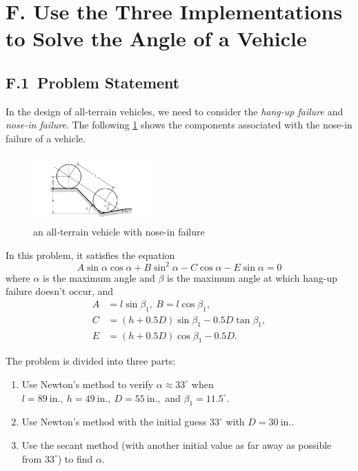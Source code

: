 \documentclass[a4paper]{article}
\begin{document}
\section*{F. Use the Three Implementations to Solve the Angle of a Vehicle}

\subsection*{F.1\ Problem Statement}

In the design of all-terrain vehicles, we need to consider the \textit{hang-up failure} and \textit{nose-in failure}. 
The following \cref{fig:F} shows the components associated with the nose-in failure of a vehicle. 

\begin{figure}[htbp]
  \centering
  \includegraphics[width = 0.4\textwidth]{../images/F.png}
  \caption{an all-terrain vehicle with nose-in failure}
  \label{fig:F}
\end{figure}

In this problem, it satisfies the equation
\begin{equation}
  A \sin \alpha \cos \alpha + B \sin^2 \alpha - C \cos \alpha - E \sin \alpha = 0
  \label{eq:F}
\end{equation}
where $\alpha$ is the maximum angle and $\beta$ is the maximum angle at which hang-up failure doesn't occur, and 
\begin{equation}
  \begin{aligned}
    A &= l \sin \beta_1,\ B = l \cos \beta_1, \\
    C &= (h + 0.5D)\sin \beta_1 - 0.5 D \tan \beta_1, \\
    E &= (h + 0.5D)\cos \beta_1 - 0.5D.
  \end{aligned}
  \label{eq:F.components}
\end{equation}

The problem is divided into three parts:
\begin{enumerate}
  \item Use Newton's method to verify $\alpha \approx 33^{\circ}$ when $l = 89\ \mathrm{in.},\ h = 49\ \mathrm{in.},\ D = 55\ \mathrm{in.},$ and $\beta_1 = 11.5^{\circ}$.
  \item Use Newton's method with the initial guess $33^{\circ}$ with $D = 30\ \mathrm{in.}$.
  \item Use the secant method (with another initial value as far away as possible from $33^{\circ}$) to find $\alpha$.
\end{enumerate}
\end{document}
